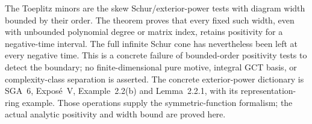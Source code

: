 The Toeplitz minors are the skew Schur/exterior-power tests with
diagram width bounded by their order. The theorem proves that
every fixed such width, even with unbounded polynomial degree or
matrix index, retains positivity for a negative-time interval.
The full infinite Schur cone has nevertheless been left at every
negative time. This is a concrete failure of bounded-order
positivity tests to detect the boundary; no finite-dimensional
pure motive, integral GCT basis, or complexity-class separation
is asserted.
The concrete exterior-power dictionary is SGA~6, Expos\'e~V,
Example~2.2(b) and Lemma~2.2.1, with its representation-ring
example. Those operations supply the symmetric-function
formalism; the actual analytic positivity and width bound
are proved here.
